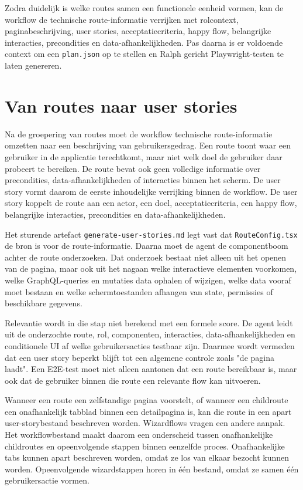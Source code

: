 Zodra duidelijk is welke routes samen een functionele eenheid vormen, kan de workflow de technische route-informatie verrijken met rolcontext, paginabeschrijving, user stories, acceptatiecriteria, happy flow, belangrijke interacties, precondities en data-afhankelijkheden. Pas daarna is er voldoende context om een \texttt{plan.json} op te stellen en Ralph gericht Playwright-testen te laten genereren.

\section{Van routes naar user stories}

Na de groepering van routes moet de workflow technische route-informatie omzetten naar een beschrijving van gebruikersgedrag. Een route toont waar een gebruiker in de applicatie terechtkomt, maar niet welk doel de gebruiker daar probeert te bereiken. De route bevat ook geen volledige informatie over precondities, data-afhankelijkheden of interacties binnen het scherm. De user story vormt daarom de eerste inhoudelijke verrijking binnen de workflow. De user story koppelt de route aan een actor, een doel, acceptatiecriteria, een happy flow, belangrijke interacties, precondities en data-afhankelijkheden.

Het sturende artefact \texttt{generate-user-stories.md} legt vast dat \texttt{RouteConfig.tsx} de bron is voor de route-informatie. Daarna moet de agent de componentboom achter de route onderzoeken. Dat onderzoek bestaat niet alleen uit het openen van de pagina, maar ook uit het nagaan welke interactieve elementen voorkomen, welke GraphQL-queries en mutaties data ophalen of wijzigen, welke data vooraf moet bestaan en welke schermtoestanden afhangen van state, permissies of beschikbare gegevens.

Relevantie wordt in die stap niet berekend met een formele score. De agent leidt uit de onderzochte route, rol, componenten, interacties, data-afhankelijkheden en conditionele UI af welke gebruikersacties testbaar zijn. Daarmee wordt vermeden dat een user story beperkt blijft tot een algemene controle zoals "de pagina laadt". Een E2E-test moet niet alleen aantonen dat een route bereikbaar is, maar ook dat de gebruiker binnen die route een relevante flow kan uitvoeren.

Wanneer een route een zelfstandige pagina voorstelt, of wanneer een childroute een onafhankelijk tabblad binnen een detailpagina is, kan die route in een apart user-storybestand beschreven worden. Wizardflows vragen een andere aanpak. Het workflowbestand maakt daarom een onderscheid tussen onafhankelijke childroutes en opeenvolgende stappen binnen eenzelfde proces. Onafhankelijke tabs kunnen apart beschreven worden, omdat ze los van elkaar bezocht kunnen worden. Opeenvolgende wizardstappen horen in één bestand, omdat ze samen één gebruikersactie vormen.

